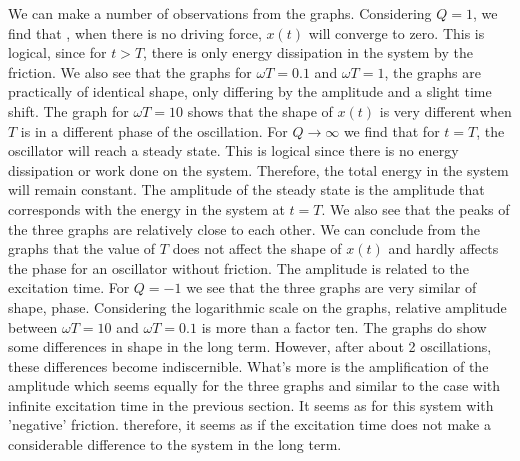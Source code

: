 We can make a number of observations from the graphs. Considering $Q = 1$, we find that , when there is no driving force, $x(t)$ will converge to zero. This is logical, since for $t>T$, there is only energy dissipation in the system by the friction. We also see that the graphs for $\omega T = 0.1$ and $\omega T =1$, the graphs are practically of identical shape, only differing by the amplitude and a slight time shift. The graph for $\omega T = 10$ shows that the shape of $x(t)$ is very different when $T$ is in a different phase of the oscillation.
For $Q \rightarrow \infty$ we find that for $t=T$, the oscillator will reach a steady state. This is logical since there is no energy dissipation or work done on the system. Therefore, the total energy in the system will remain constant. The amplitude of the steady state is the amplitude that corresponds with the energy in the system at $t=T$. We also see that the peaks of the three graphs are relatively close to each other. We can conclude from the graphs that the value of $T$ does not affect the shape of $x(t)$ and hardly affects the phase for an oscillator without friction. The amplitude is related to the excitation time.
For $Q=-1$ we see that the three graphs are very similar of shape, phase. Considering the logarithmic scale on the graphs, relative amplitude between $\omega T = 10$ and $\omega T = 0.1$ is more than a factor ten. The graphs do show some differences in shape in the long term. However, after about 2 oscillations, these differences become indiscernible. What's more is the amplification of the amplitude which seems equally for the three graphs and similar to the case with infinite excitation time in the previous section. It seems as for this system with 'negative' friction. therefore, it seems as if the excitation time does not make a considerable difference to the system in the long term.